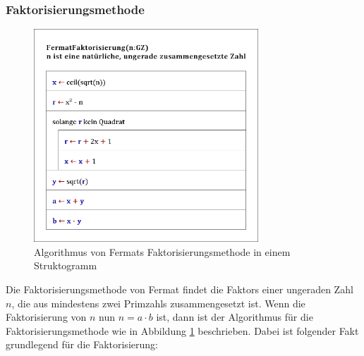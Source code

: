     \subsubsection{Faktorisierungsmethode} \label{sec:faktorMethode}
        \begin{figure}[htb]
            \centering
            \includegraphics[width=0.75\textwidth]{img/factor_algorithm.png}
            \caption{Algorithmus von Fermats Faktorisierungsmethode in einem Struktogramm}
            \label{fig:factorAlgorithm}
        \end{figure}
        Die Faktorisierungsmethode von Fermat findet die \Glspl{Faktor} einer  ungeraden Zahl $n$, die aus mindestens zwei \Glspl{Primzahl} zusammengesetzt ist. Wenn die Faktorisierung von $n$ nun $n = a \cdot b$ ist, dann ist der Algorithmus für die Faktorisierungsmethode wie in Abbildung \ref{fig:factorAlgorithm} beschrieben. Dabei ist folgender Fakt grundlegend für die Faktorisierung:
        
